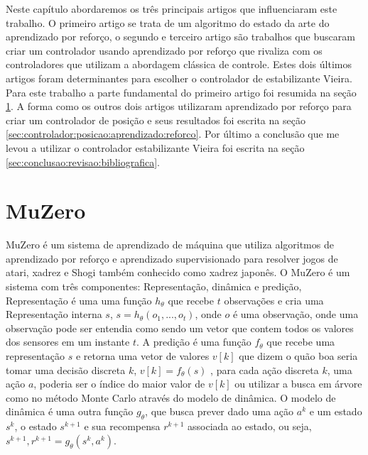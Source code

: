 
\label{Cap:TrabalhosRelacionados}
Neste capítulo abordaremos os três principais artigos que influenciaram
este trabalho. O primeiro artigo se trata de um algoritmo do estado
da arte do aprendizado por reforço, o segundo e terceiro artigo são
trabalhos que buscaram criar um controlador usando aprendizado por reforço
que rivaliza com os controladores que utilizam a abordagem clássica de controle.
Estes dois últimos artigos foram determinantes para escolher o controlador
de estabilizante Vieira. Para este trabalho a parte fundamental do primeiro artigo
foi resumida na seção \ref{sec:muzero}. A forma como os outros dois artigos
utilizaram aprendizado por reforço para criar um controlador de posição e seus
resultados foi escrita na seção \ref{sec:controlador:posicao:aprendizado:reforco}.
Por último a conclusão que me levou a utilizar o controlador estabilizante Vieira
foi escrita na seção \ref{sec:conclusao:revisao:bibliografica}.

\section{MuZero}
\label{sec:muzero}

MuZero é um sistema de aprendizado de máquina que utiliza algoritmos de
aprendizado por reforço e aprendizado supervisionado para
resolver jogos de atari, xadrez e Shogi também conhecido como
xadrez japonês. O MuZero é um sistema com três componentes:
Representação, dinâmica e predição, Representação é uma uma
função $h_{\theta}$  que recebe $t$ observações 
e cria uma Representação interna $s$, $s = h_{\theta}(o_1,...,o_t)$,
onde $o$ é uma observação, onde uma observação pode ser entendia como sendo
um vetor que contem todos os valores dos sensores em um instante $t$.
A predição é uma função $f_{\theta}$ que recebe uma representação $s$
e retorna uma vetor de valores $v[k]$ que dizem o quão boa seria tomar
uma decisão discreta $k$,  $v[k] =  f_{\theta}(s)$ ,
para cada ação discreta $k$, uma ação $a$, poderia ser o índice do maior
valor de $v[k]$ ou utilizar a busca em árvore como no método Monte Carlo
através do modelo de dinâmica. O modelo de dinâmica é uma outra função
$g_{\theta}$, que busca prever dado uma ação $a^k$ e um estado $s^{k}$,
o estado $s^{k+1}$ e sua recompensa $r^{k+1}$ associada ao estado,
ou seja, $s^{k+1},r^{k+1}=  g_{\theta}(s^{k},a^k)$.


